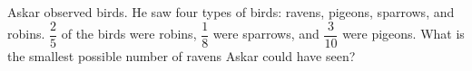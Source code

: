 Askar observed birds. He saw four types of birds: ravens, pigeons, sparrows, and robins. $\dfrac{2}{5}$ of the birds were robins, $\dfrac{1}{8}$ were sparrows, and $\dfrac{3}{10}$ were pigeons. What is the smallest possible number of ravens Askar could have seen?
